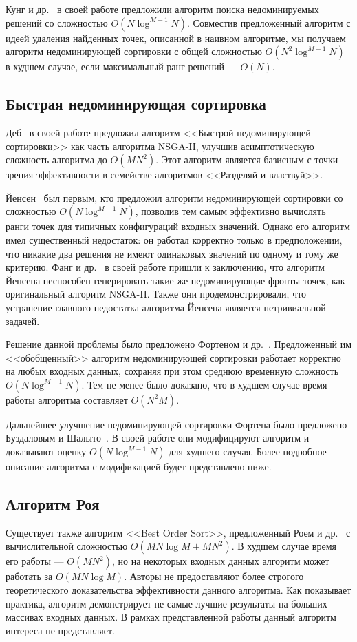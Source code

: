Кунг и др.~\cite{kung75} в своей работе предложили алгоритм поиска недоминируемых решений со сложностью $O(N\log^{M-1}N)$. Совместив предложенный алгоритм с идеей удаления найденных точек, описанной в наивном алгоритме, мы получаем алгоритм недоминирующей сортировки с общей сложностью $O(N^2\log^{M-1}N)$ в худшем случае, если максимальный ранг решений --- $O(N)$.

\subsection{Быстрая недоминирующая сортировка}
Деб~\cite{deb00} в своей работе предложил алгоритм <<Быстрой недоминирующей сортировки>> как часть алгоритма NSGA-II, улучшив асимптотическую сложность алгоритма до $O(MN^2)$. Этот алгоритм является базисным с точки зрения эффективности в семействе алгоритмов <<Разделяй и властвуй>>.

Йенсен~\cite{jensen03} был первым, кто предложил алгоритм недоминирующей сортировки со сложностью $O(N\log^{M-1}N)$, позволив тем самым эффективно вычислять ранги точек для типичных конфигураций входных значений. Однако его алгоритм имел существенный недостаток: он работал корректно только в предположении, что никакие два решения не имеют одинаковых значений по одному и тому же критерию. Фанг и др.~\cite{fang08} в своей работе пришли к заключению, что алгоритм Йенсена неспособен генерировать такие же недоминирующие фронты точек, как оригинальный алгоритм NSGA-II. Также они продемонстрировали, что устранение главного недостатка алгоритма Йенсена является нетривиальной задачей.

Решение данной проблемы было предложено Фортеном и др.~\cite{fortin13}. Предложенный им <<обобщенный>> алгоритм недоминирующей сортировки работает корректно на любых входных данных, сохраняя при этом среднюю временную сложность $O(N\log^{M-1}N)$. Тем не менее было доказано, что в худшем случае время работы алгоритма составляет $O(N^2M)$.

Дальнейшее улучшение недоминирующей сортировки Фортена было предложено Буздаловым и Шалыто~\cite{buzdalov14}. В своей работе они модифицируют алгоритм и доказывают оценку $O(N\log^{M-1}N)$ для худшего случая. Более подробное описание алгоритма с модификацией будет представлено ниже.

\subsection{Алгоритм Роя}
Существует также алгоритм <<Best Order Sort>>, предложенный Роем и др.~\cite{roy16} с вычислительной сложностью $O(MN\log{M}+MN^2)$. В худшем случае время его работы --- $O(MN^2)$, но на некоторых входных данных алгоритм может работать за $O(MN\log{M})$. Авторы не предоставляют более строгого теоретического доказательства эффективности данного алгоритма. Как показывает практика, алгоритм демонстрирует не самые лучшие результаты на больших массивах входных данных. В рамках представленной работы данный алгоритм интереса не представляет.

